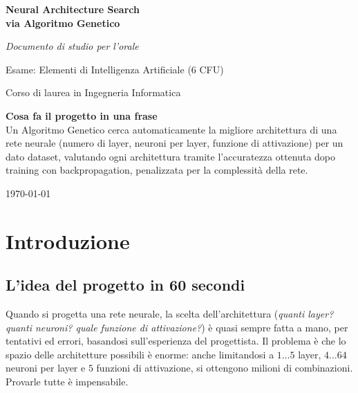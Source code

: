 \documentclass[11pt,a4paper]{article}
\begin{document}
\begin{titlepage}
    \centering
    \vspace*{2cm}
    {\Huge\bfseries\color{darkblue} Neural Architecture Search\\[0.3cm]
    via Algoritmo Genetico\par}
    \vspace{0.5cm}
    {\large\itshape Documento di studio per l'orale\par}
    \vspace{2cm}
    {\Large Esame: Elementi di Intelligenza Artificiale (6 CFU)\par}
    \vspace{0.3cm}
    {\large Corso di laurea in Ingegneria Informatica\par}
    \vfill
    \begin{tcolorbox}[colback=boxbg, colframe=midblue!50, boxrule=0.5pt]
    \textbf{Cosa fa il progetto in una frase}\\[0.2cm]
    Un Algoritmo Genetico cerca automaticamente la migliore architettura di una rete
    neurale (numero di layer, neuroni per layer, funzione di attivazione) per un dato
    dataset, valutando ogni architettura tramite l'accuratezza ottenuta dopo training
    con backpropagation, penalizzata per la complessità della rete.
    \end{tcolorbox}
    \vfill
    {\large \today\par}
\end{titlepage}

\tableofcontents
\newpage

\section{Introduzione}

\subsection{L'idea del progetto in 60 secondi}

Quando si progetta una rete neurale, la scelta dell'architettura
(\emph{quanti layer? quanti neuroni? quale funzione di attivazione?}) è
quasi sempre fatta a mano, per tentativi ed errori, basandosi sull'esperienza
del progettista. Il problema è che lo spazio delle architetture possibili è
enorme: anche limitandosi a $1\dots 5$ layer, $4\dots 64$ neuroni per layer e
$5$ funzioni di attivazione, si ottengono milioni di combinazioni. Provarle
tutte è impensabile.
\end{document}
